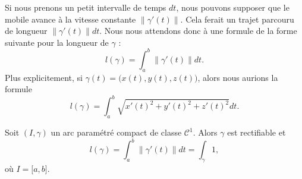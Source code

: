 Si nous prenons un petit intervalle de temps \( dt\), nous pouvons supposer que le mobile avance à la vitesse constante \( \| \gamma'(t) \|\). Cela ferait un trajet parcouru de longueur \( \| \gamma'(t) \|dt\). Nous nous attendons donc à une formule de la forme suivante pour la longueur de \( \gamma\) :
\begin{equation}        \label{EqDefLongueurChemin}
	l(\gamma)=\int_a^b\| \gamma'(t) \|dt.
\end{equation}
Plus explicitement, si \( \gamma(t)=\big( x(t),y(t),z(t) \big)\), alors nous aurions la formule
\begin{equation}
	l(\gamma)=\int_a^b\sqrt{x'(t)^2+y'(t)^2+z'(t)^2}dt.
\end{equation}


\begin{theorem}     \label{ThoLongueurIntegrale}
	Soit \( (I,\gamma)\) un arc paramétré compact de classe \( \mathcal{C}^1\). Alors \( \gamma\) est rectifiable et
	\begin{equation}        \label{EqLongGammalInt}
		l(\gamma)=\int_a^b\| \gamma'(t) \|dt=\int_{\gamma}1,
	\end{equation}
	où \( I=\mathopen[ a , b \mathclose]\).
\end{theorem}

